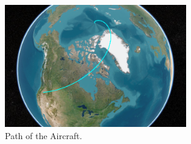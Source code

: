 \documentclass[12pt]{article}
\begin{document}
\begin{adjustwidth}{10mm}{0mm}
    \begin{figure}[H]
      \centering
      \includegraphics[width=0.7\textwidth]{path_1-3.png}
      \caption{Path of the Aircraft.}
    \end{figure}
  \end{adjustwidth}

\end{document}
